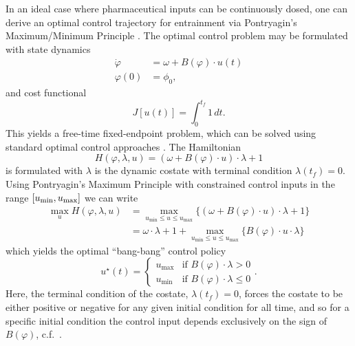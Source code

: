 In an ideal case where pharmaceutical inputs can be continuously dosed, one can derive an optimal control trajectory for entrainment via Pontryagin's Maximum/Minimum Principle \cite{Kirk2012pontryagin}.
The optimal control problem may be formulated with state dynamics
\begin{align}\label{eq:ode}
        \dot\varphi &= \omega + B(\varphi)\cdot u(t)\\
        \nonumber\varphi(0) &= \phi_0,
\end{align}
and cost functional
\begin{equation}\label{eq:j}
    J[u(t)] = \int_0^{t_f} 1\, dt.
\end{equation}
This yields a free-time fixed-endpoint problem, which can be solved using standard optimal control approaches \cite{Kirk2012pontryagin, Qiao2017}.
The Hamiltonian
\begin{equation}\label{eq:hamiltonian}
        H(\varphi,\lambda,u) = (\omega+B(\varphi)\cdot u)\cdot\lambda +1
    \end{equation}
    is formulated with $\lambda$ is the dynamic costate with terminal condition $\lambda(t_f)=0$.
Using Pontryagin's Maximum Principle with constrained control inputs in the range $[u_{\rm min}, u_{\rm max}]$ we can write
    \begin{align*}
        \max_{u} H(\varphi,\lambda,u)&= \max_{u_{\min}\leq u\leq u_{\max}}\{(\omega+B(\varphi)\cdot u)\cdot\lambda +1\}\\
        \nonumber &= \omega\cdot\lambda + 1+ \max_{u_{\min}\leq u\leq u_{\max}}\{B(\varphi)\cdot u \cdot\lambda\}
    \end{align*}
which yields the optimal ``bang-bang'' control policy
    \begin{equation}
    u^\star(t) = \begin{cases}u_{\max} &\mbox{if } B(\varphi)\cdot\lambda >0 \\
        u_{\min} & \mbox{if }B(\varphi)\cdot\lambda \leq0 \end{cases}.
    \end{equation}
    Here, the terminal condition of the costate, $\lambda(t_f)=0$, forces the costate to be either positive or negative for any given initial condition for all time, and so for a specific initial condition the control input depends exclusively on the sign of $B(\varphi)$, c.f.\ \cite{Qiao2017}.



